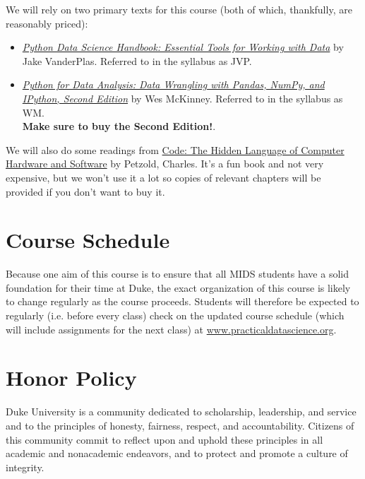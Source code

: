 \documentclass[12pt]{article}
\begin{document}
We will rely on two primary texts for this course (both of which, thankfully, are reasonably priced):

\begin{itemize}
	\item \href{https://www.amazon.com/Python-Data-Science-Handbook-Essential-dp-1491912057/dp/1491912057}{\emph{Python Data Science Handbook: Essential Tools for Working with Data}} by Jake VanderPlas. Referred to in the syllabus as JVP.
	\item \href{https://www.amazon.com/gp/product/1491957662}{\emph{Python for Data Analysis: Data Wrangling with Pandas, NumPy, and IPython, Second Edition}} by Wes McKinney. Referred to in the syllabus as WM. \\
	\textbf{Make sure to buy the Second Edition!}.
\end{itemize}

We will also do some readings from \href{https://www.amazon.com/Code-Language-Computer-Hardware-Software/dp/0735611319}{Code: The Hidden Language of Computer Hardware and Software} by Petzold, Charles. It's a fun book and not very expensive, but we won't use it a lot so copies of relevant chapters will be provided if you don't want to buy it.

\section{Course Schedule}

Because one aim of this course is to ensure that all MIDS students have a solid foundation for their time at Duke, the exact organization of this course is likely to change regularly as the course proceeds. Students will therefore be expected to regularly (i.e. before every class) check on the updated course schedule (which will include assignments for the next class) at \href{https://www.practicaldatascience.org}{www.practicaldatascience.org}.


\section{Honor Policy}

Duke University is a community dedicated to scholarship, leadership, and service and to the principles of honesty, fairness, respect, and accountability. Citizens of this community commit to reflect upon and uphold these principles in all academic and nonacademic endeavors, and to protect and promote a culture of integrity.
\end{document}
